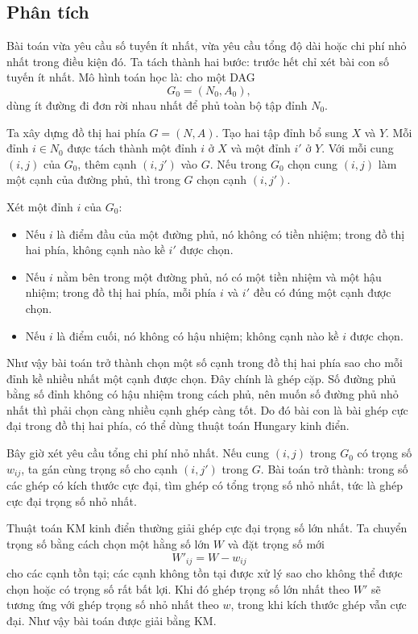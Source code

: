 \documentclass[11pt]{article}
\begin{document}
\subsection{Phân tích}

Bài toán vừa yêu cầu số tuyến ít nhất, vừa yêu cầu tổng độ dài hoặc chi phí
nhỏ nhất trong điều kiện đó. Ta tách thành hai bước: trước hết chỉ xét bài con
số tuyến ít nhất. Mô hình toán học là: cho một DAG
\[
  G_0=(N_0,A_0),
\]
dùng ít đường đi đơn rời nhau nhất để phủ toàn bộ tập đỉnh $N_0$.

Ta xây dựng đồ thị hai phía $G=(N,A)$. Tạo hai tập đỉnh bổ sung $X$ và $Y$.
Mỗi đỉnh $i\in N_0$ được tách thành một đỉnh $i$ ở $X$ và một đỉnh $i'$ ở
$Y$. Với mỗi cung $(i,j)$ của $G_0$, thêm cạnh $(i,j')$ vào $G$. Nếu trong
$G_0$ chọn cung $(i,j)$ làm một cạnh của đường phủ, thì trong $G$ chọn cạnh
$(i,j')$.

Xét một đỉnh $i$ của $G_0$:
\begin{itemize}
  \item Nếu $i$ là điểm đầu của một đường phủ, nó không có tiền nhiệm; trong
  đồ thị hai phía, không cạnh nào kề $i'$ được chọn.
  \item Nếu $i$ nằm bên trong một đường phủ, nó có một tiền nhiệm và một hậu
  nhiệm; trong đồ thị hai phía, mỗi phía $i$ và $i'$ đều có đúng một cạnh được
  chọn.
  \item Nếu $i$ là điểm cuối, nó không có hậu nhiệm; không cạnh nào kề $i$ được
  chọn.
\end{itemize}

Như vậy bài toán trở thành chọn một số cạnh trong đồ thị hai phía sao cho mỗi
đỉnh kề nhiều nhất một cạnh được chọn. Đây chính là ghép cặp. Số đường phủ
bằng số đỉnh không có hậu nhiệm trong cách phủ, nên muốn số đường phủ nhỏ nhất
thì phải chọn càng nhiều cạnh ghép càng tốt. Do đó bài con là bài ghép cực đại
trong đồ thị hai phía, có thể dùng thuật toán Hungary kinh điển.

Bây giờ xét yêu cầu tổng chi phí nhỏ nhất. Nếu cung $(i,j)$ trong $G_0$ có
trọng số $w_{ij}$, ta gán cùng trọng số cho cạnh $(i,j')$ trong $G$. Bài toán
trở thành: trong số các ghép có kích thước cực đại, tìm ghép có tổng trọng số
nhỏ nhất, tức là ghép cực đại trọng số nhỏ nhất.

Thuật toán KM kinh điển thường giải ghép cực đại trọng số lớn nhất. Ta chuyển
trọng số bằng cách chọn một hằng số lớn $W$ và đặt trọng số mới
\[
  W'_{ij}=W-w_{ij}
\]
cho các cạnh tồn tại; các cạnh không tồn tại được xử lý sao cho không thể được
chọn hoặc có trọng số rất bất lợi. Khi đó ghép trọng số lớn nhất theo $W'$ sẽ
tương ứng với ghép trọng số nhỏ nhất theo $w$, trong khi kích thước ghép vẫn
cực đại. Như vậy bài toán được giải bằng KM.
\end{document}
